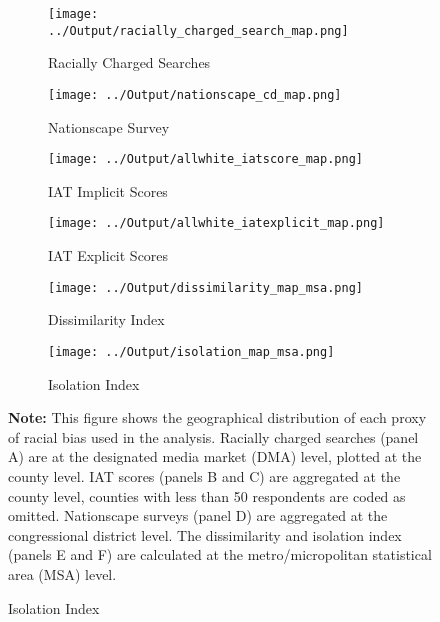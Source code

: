 \documentclass[11pt]{article}
\begin{document}
\newpage
\begin{figure}[H]
	\caption{\textbf{Geographical Distribution of Racial Animus}}\label{race_map}
	\centering
	\begin{subfigure}{0.5\linewidth}
   		\caption{Racially Charged Searches}
   		\centering
		\texttt{[image: ../Output/racially\_charged\_search\_map.png]}
		\vspace{0.5cm}
   	\end{subfigure}%
   	\begin{subfigure}{0.5\linewidth}
   		\caption{Nationscape Survey}
   		\centering
   		\texttt{[image: ../Output/nationscape\_cd\_map.png]}
		\vspace{0.5cm}
	\end{subfigure}
	\begin{subfigure}{0.5\linewidth}
   		\caption{IAT Implicit Scores}
   		\centering
  	 	\texttt{[image: ../Output/allwhite\_iatscore\_map.png]}
	 	\vspace{0.5cm}
	\end{subfigure}%
  	\begin{subfigure}{0.5\linewidth}
  		\caption{IAT Explicit Scores}
  		\centering
   		\texttt{[image: ../Output/allwhite\_iatexplicit\_map.png]}
		\vspace{0.5cm}
  	 \end{subfigure}

	\begin{subfigure}{0.5\linewidth}
   		\caption{ Dissimilarity Index}
   		\centering
  	 	\texttt{[image: ../Output/dissimilarity\_map\_msa.png]}
  	\end{subfigure}%
  	\begin{subfigure}{0.5\linewidth}
  		\caption{ Isolation Index}
  		\centering
   		\texttt{[image: ../Output/isolation\_map\_msa.png]}
  	\end{subfigure}

	\begin{minipage}{1\textwidth} \medskip
		\footnotesize{{\bf Note: }This figure shows the geographical distribution of each proxy of racial bias used in the analysis. Racially charged searches (panel A) are at the designated media market (DMA) level, plotted at the county level. IAT scores (panels B and C) are aggregated at the county level, counties with less than 50 respondents are coded as omitted. Nationscape surveys (panel D) are aggregated at the congressional district level. The dissimilarity and isolation index (panels E and F) are calculated at the metro/micropolitan statistical area (MSA) level.}
	\end{minipage}
\end{figure}
\end{document}
